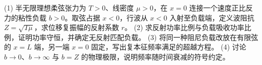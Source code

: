 (1) 半无限理想柔弦张力为 \(T>0\)、线密度 \(\mu>0\)，在 \(x=0\) 连接一个速度正比反力的粘性负载 \(b>0\)。取弦占据 \(x<0\)，行波从 \(x<0\) 入射至负载端，定义波阻抗 \(Z=\sqrt{T\mu}\)，求位移复振幅的反射系数 \(r\)。
(2) 求反射功率比例与负载吸收功率比例，证明功率守恒，并确定无反射匹配负载。
(3) 将同一种阻尼负载改放在有限弦的 \(x=L\) 端，另一端 \(x=0\) 固定，写出复本征频率满足的超越方程。
(4) 讨论 \(b\to0\)、\(b\to\infty\) 与 \(b=Z\) 的物理极限，说明频率随时间衰减的符号约定。
